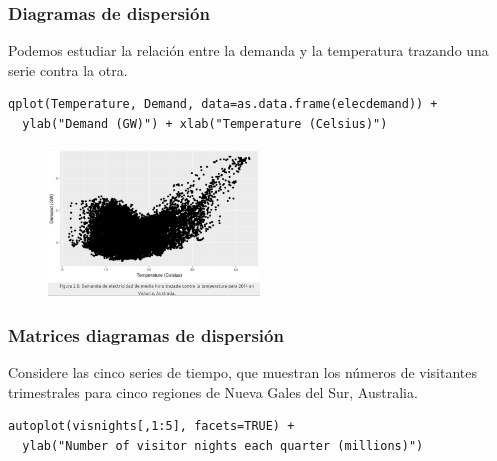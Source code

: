\documentclass[10pt]{beamer}
\begin{document}





\begin{frame}[fragile]
\frametitle{Diagramas de dispersión}

Podemos estudiar la relación entre la demanda y la temperatura trazando una serie contra la otra.


\lstset{language=r,label= ,caption= ,captionpos=b,numbers=none}
\begin{lstlisting}
qplot(Temperature, Demand, data=as.data.frame(elecdemand)) +
  ylab("Demand (GW)") + xlab("Temperature (Celsius)")
\end{lstlisting}

\pause

\begin{figure}
\begin{center}
    \includegraphics[width=0.5\textwidth]{Imagen23.JPG}
\end{center}
\end{figure}

\end{frame}




\begin{frame}[fragile]
\frametitle{Matrices diagramas de dispersión}

Considere las cinco series de tiempo, que muestran los números de visitantes trimestrales para cinco regiones de Nueva Gales del Sur, Australia.

\vspace{4mm}

\lstset{language=r,label= ,caption= ,captionpos=b,numbers=none}
\begin{lstlisting}
autoplot(visnights[,1:5], facets=TRUE) +
  ylab("Number of visitor nights each quarter (millions)")
  \end{lstlisting}


\end{frame}
\end{document}
